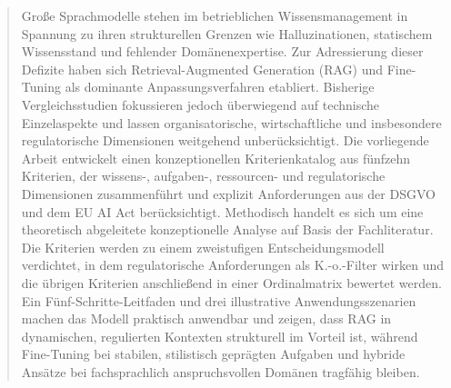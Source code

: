 
\begin{abstract}
Große Sprachmodelle stehen im betrieblichen Wissensmanagement in Spannung zu ihren strukturellen Grenzen wie Halluzinationen, statischem Wissensstand und fehlender Domänenexpertise. Zur Adressierung dieser Defizite haben sich Retrieval-Augmented Generation (RAG) und Fine-Tuning als dominante Anpassungsverfahren etabliert. Bisherige Vergleichsstudien fokussieren jedoch überwiegend auf technische Einzelaspekte und lassen organisatorische, wirtschaftliche und insbesondere regulatorische Dimensionen weitgehend unberücksichtigt. Die vorliegende Arbeit entwickelt einen konzeptionellen Kriterienkatalog aus fünfzehn Kriterien, der wissens-, aufgaben-, ressourcen- und regulatorische Dimensionen zusammenführt und explizit Anforderungen aus der DSGVO und dem EU AI Act berücksichtigt. Methodisch handelt es sich um eine theoretisch abgeleitete konzeptionelle Analyse auf Basis der Fachliteratur. Die Kriterien werden zu einem zweistufigen Entscheidungsmodell verdichtet, in dem regulatorische Anforderungen als K.-o.-Filter wirken und die übrigen Kriterien anschließend in einer Ordinalmatrix bewertet werden. Ein Fünf-Schritte-Leitfaden und drei illustrative Anwendungsszenarien machen das Modell praktisch anwendbar und zeigen, dass RAG in dynamischen, regulierten Kontexten strukturell im Vorteil ist, während Fine-Tuning bei stabilen, stilistisch geprägten Aufgaben und hybride Ansätze bei fachsprachlich anspruchsvollen Domänen tragfähig bleiben.
\end{abstract}
